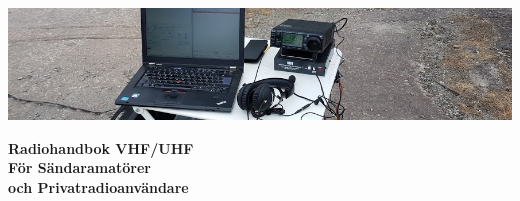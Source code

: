 \newcommand{\TitleText}{Radiohandbok VHF/UHF}
\newcommand{\SubtitleText}{För Sändaramatörer\\ och Privatradioanvändare}
\newcommand{\Forfattare}{Täpp-Anders Sikvall}
\newcommand{\Initialer}{SMØUEI}
\newcommand{\DokYear}{19}
\newcommand{\DokVersion}{2.1.1}
\newcommand{\DokumentRevision}{x.y.z}
\newcommand{\DokumentDatum}{\today}


\renewcommand{\arraystretch}{1.15}

\titlefoottrue %



	
	
	\pagestyle{empty}
	\vfill
	\vspace*{4cm}
	\centerline{\includegraphics[width=\paperwidth]{logo/rubrikbild}}
	\begin{flushright}
		\Huge{\bfseries{\TitleText}} \\[3mm]
		\Large{\bfseries{\SubtitleText}}
	\end{flushright}
	
	\vfill
	
	
